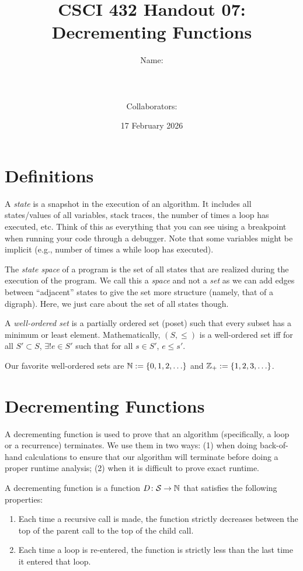 \documentclass{article}
\title{CSCI 432 Handout 07: Decrementing Functions}
\author{Name: \rule{3in}{0.15mm} \\~\\
    Collaborators: \rule{3in}{0.15mm} }
\date{17 February 2026}
\begin{document}
\maketitle

\noindent
\section*{Definitions}

\begin{definition}
    A \emph{state} is a snapshot in the execution of an algorithm. It includes
    all states/values of all variables, stack traces, the number of times a loop
    has executed, etc. Think of this as everything that you can see uising a
    breakpoint when running your code through a debugger.  Note that some
    variables might be implicit (e.g., number of times a while loop has
    executed).

    The \emph{state space} of a program is the set of all states that are
    realized during the execution of the program. We call this a \emph{space} and not
    a \emph{set} as we can add edges between ``adjacent'' states to give the set
    more structure (namely, that of a digraph). Here, we just care about the set
    of all states though.
\end{definition}

\begin{definition}
    A \emph{well-ordered set} is a partially ordered set (poset)
    such that every subset has a minimum or least
    element.  Mathematically, $(S, \leq)$ is a well-ordered set iff for all $S'
    \subset S$, $\exists! e \in S'$ such that for all $s \in S'$, $e \leq s'$.

    Our favorite well-ordered sets are ${\mathbb N}:=\{0,1,2, \ldots\}$ and
    ${\mathbb Z}_+ :=\{1,2,3, \ldots\}$.
\end{definition}

\section*{Decrementing Functions}

A decrementing function is used to prove that an algorithm (specifically, a loop
or a recurrence) terminates.  We use
them in two ways: (1) when doing back-of-hand calculations to ensure that our
algorithm will terminate before doing a proper runtime analysis; (2) when it is
difficult to prove exact runtime.

\begin{definition}
    A decrementing function is a function $D \colon \mathcal{S} \to {\mathbb N}$ that
    satisfies the following properties:
    \begin{enumerate}[(1)]
        \item Each time a recursive call is made, the function strictly
            decreases between the top of the parent call to the top of the child
            call.
        \item Each time a loop is re-entered, the function is strictly less than
            the last time it entered that loop.
    \end{enumerate}
\end{definition}
\end{document}
